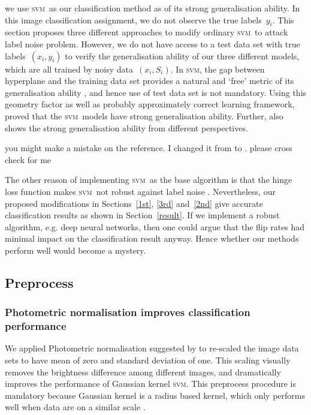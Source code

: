 \documentclass[12pt]{article} %
\newcommand{\svm}{\textsc{svm}}
\begin{document}
we use \svm\ as our classification method as of its strong generalisation ability. In this image classification assignment, we do not observe the true  labels~$y_i$. This section proposes three different approaches to modify ordinary \svm\ to attack label noise problem. However, we do not have access to a test data set with true labels~$(x_i,y_i)$ to verify the generalisation ability of our three different models, which are all trained by noisy data~$(x_i,S_i)$. In \svm , the gap between hyperplane and the training data set provides a natural and `free' metric of its generalisation ability  \citep{hastie01statisticallearning}, and hence use of test data set is not mandatory. Using this geometry factor as well as probably approximately correct learning framework,  \citet{NIPS2012_4500} proved that the  \svm\ models have strong generalisation ability. Further,  \citep{Cortes1995,Seeger:2003:PGE:944919.944929} also shows the strong generalisation ability from different perspectives.

{\color{red} you might make a mistake on the reference. I changed it from \citet{Fernandez-Delgado:2014:WNH:2627435.2697065} to \citep{frenay2014classification}. please cross check for me}

The other reason of implementing \svm\ as the base algorithm is that the hinge loss function makes \svm\ not robust against label noise \citep{frenay2014classification}. Nevertheless, our proposed modifications in Sections~\ref{1st}, \ref{3rd} and~\ref{2nd} give accurate classification results as shown in Section~\ref{result}. If we implement a robust algorithm, e.g. deep neural networks, then one could argue that the flip rates had minimal impact on the classification result anyway. Hence whether our methods perform well would become a mystery.


\subsection{Preprocess}\label{preproc}
\subsubsection{Photometric normalisation improves classification performance}
We applied Photometric normalisation suggested by \citet{jonsson2002support} to re-scaled the image data sets to have mean of zero and standard deviation of one. This scaling visually removes the brightness difference among different images, and dramatically improves the performance of Gaussian kernel \svm . This preprocess procedure is mandatory because Gaussian kernel is a radius based kernel, which only performs well when data are on a similar scale \citep{jonsson2002support}. 
\end{document}
